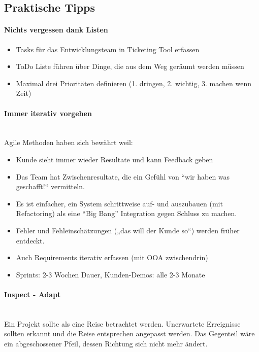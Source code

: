 \subsection{Praktische Tipps}
\paragraph{Nichts vergessen dank Listen} \hfill
\begin{itemize}
	\item Tasks für das Entwicklungsteam in Ticketing Tool erfassen
	\item ToDo Liste führen über Dinge, die aus dem Weg geräumt werden müssen
	\item Maximal drei Prioritäten definieren (1. dringen, 2. wichtig, 3. machen wenn Zeit)
\end{itemize}

\paragraph{Immer iterativ  vorgehen} \hfill \\
Agile Methoden haben sich bewährt weil:
\begin{itemize}
	\item Kunde sieht immer wieder Resultate und kann Feedback geben
	\item Das Team hat Zwischenresultate, die ein Gefühl von “wir haben was geschafft!“ vermitteln.
	\item Es ist einfacher, ein System schrittweise auf- und auszubauen (mit Refactoring) als eine “Big Bang” Integration gegen Schluss zu machen.
	\item Fehler und Fehleinschätzungen („das will der Kunde so“) werden früher entdeckt.
	\item Auch Requirements iterativ erfassen (mit OOA zwischendrin)
	\item Sprints: 2-3 Wochen Dauer, Kunden-Demos: alle 2-3 Monate
\end{itemize}

\paragraph{Inspect - Adapt} \hfill \\
Ein Projekt sollte als eine Reise betrachtet werden. Unerwartete Erreignisse sollten erkannt und die Reise entsprechen angepasst werden. Das Gegenteil wäre ein abgeschossener Pfeil, dessen Richtung sich nicht mehr ändert. 


